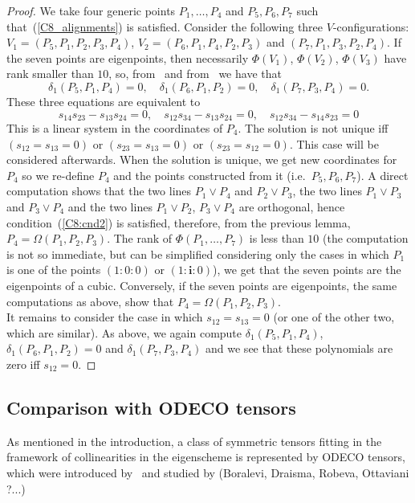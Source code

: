 \documentclass{amsart}
\theoremstyle{plain}
\theoremstyle{definition}
\newcommand{\iii}{\textbf{i}}
\begin{document}
\begin{proof}
We take four generic points
$P_1, \dots, P_4$ and $P_5, P_6, P_7$ such that~(\ref{C8_alignments})
is satisfied. Consider the following three $V$-configurations:
$V_1 = (P_5, P_1, P_2, P_3, P_4)$, $V_2 = (P_6, P_1, P_4, P_2, P_3)$
and $(P_7, P_1, P_3, P_2, P_4)$. If the seven points are eigenpoints,
then necessarily $\Phi(V_1)$, $\Phi(V_2)$, $\Phi(V_3)$ have rank
smaller than $10$, so, from~ and
from~
we have that
\[
\delta_1(P_5, P_1, P_4) = 0, \quad \delta_1(P_6, P_1, P_2) = 0, \quad
\delta_1(P_7, P_3, P_4) = 0.
\]
These three equations are equivalent to
\[
s_{14}s_{23}-s_{13}s_{24} = 0, \quad s_{12}s_{34}-s_{13}s_{24} = 0,
\quad s_{12}s_{34}-s_{14}s_{23} = 0
\]
This is a linear system in the coordinates of $P_4$. The solution is
not unique iff $(s_{12} = s_{13} = 0)$ or $(s_{23} = s_{13} = 0)$
or $(s_{23} = s_{12} = 0)$. This case will be considered afterwards.
When the solution is unique, we get new coordinates for $P_4$ so we
re-define $P_4$ and the points constructed from it (i.e.\ $P_5, P_6, P_7$).
A direct computation shows that the two lines $P_1\vee P_4$ and $P_2\vee P_3$,
the two lines $P_1\vee P_3$ and $P_3\vee P_4$ and the two lines $P_1\vee P_2$, $P_3\vee P_4$
are orthogonal, hence condition~(\ref{C8:cnd2}) is satisfied,
therefore, from the
previous lemma, $P_4 = \Omega(P_1, P_2, P_3)$. The rank
of $\Phi(P_1, \dotsc, P_7)$ is less than $10$ (the computation is
not so immediate, but can be simplified considering only the
cases in which $P_1$ is one of the points $(1: 0: 0)$ or
$(1: \iii: 0)$), we get that the seven points
are the eigenpoints of a cubic. Conversely, if the seven points are
eigenpoints, the same computations as above, show that
$P_4 = \Omega(P_1, P_2, P_3)$.\\
It remains to consider the case in which $s_{12} = s_{13} = 0$ (or one of
the other two, which are similar). As above, we again compute
$\delta_1(P_5, P_1, P_4)$, $\delta_1(P_6, P_1, P_2) = 0$ and
$\delta_1(P_7, P_3, P_4)$ and we see that these polynomials are zero
iff $s_{12} = 0$.
\end{proof}

\subsection{Comparison with ODECO tensors}
As mentioned in the introduction, a class of
symmetric tensors fitting in the framework of collinearities in the eigenscheme is represented by ODECO tensors, which were introduced by~\cite{Rob} and studied by (Boralevi, Draisma, Robeva, Ottaviani ?...)
\end{document}
